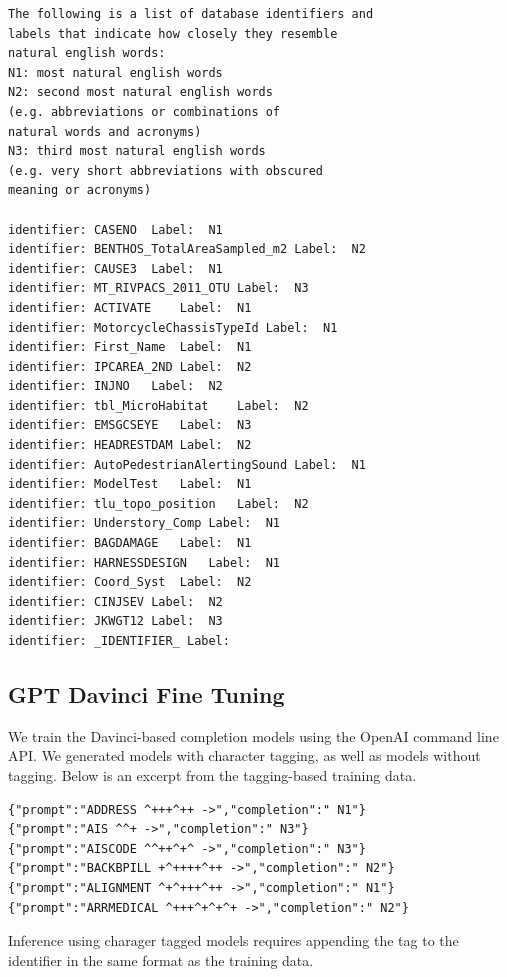 \begin{verbatim}
The following is a list of database identifiers and 
labels that indicate how closely they resemble 
natural english words:
N1: most natural english words
N2: second most natural english words 
(e.g. abbreviations or combinations of 
natural words and acronyms)
N3: third most natural english words 
(e.g. very short abbreviations with obscured 
meaning or acronyms)

identifier:	CASENO	Label:	N1
identifier:	BENTHOS_TotalAreaSampled_m2	Label:	N2
identifier:	CAUSE3	Label:	N1
identifier:	MT_RIVPACS_2011_OTU	Label:	N3
identifier:	ACTIVATE	Label:	N1
identifier:	MotorcycleChassisTypeId	Label:	N1
identifier:	First_Name	Label:	N1
identifier:	IPCAREA_2ND	Label:	N2
identifier:	INJNO	Label:	N2
identifier:	tbl_MicroHabitat	Label:	N2
identifier:	EMSGCSEYE	Label:	N3
identifier:	HEADRESTDAM	Label:	N2
identifier:	AutoPedestrianAlertingSound	Label:	N1
identifier:	ModelTest	Label:	N1
identifier:	tlu_topo_position	Label:	N2
identifier:	Understory_Comp	Label:	N1
identifier:	BAGDAMAGE	Label:	N1
identifier:	HARNESSDESIGN	Label:	N1
identifier:	Coord_Syst	Label:	N2
identifier:	CINJSEV	Label:	N2
identifier:	JKWGT12	Label:	N3
identifier: _IDENTIFIER_ Label:
\end{verbatim}


\subsection{GPT Davinci Fine Tuning}

We train the Davinci-based completion models using the OpenAI command line API.
We generated models with character tagging, as well as models without tagging.
Below is an excerpt from the tagging-based training data.

\begin{verbatim}
{"prompt":"ADDRESS ^+++^++ ->","completion":" N1"}
{"prompt":"AIS ^^+ ->","completion":" N3"}
{"prompt":"AISCODE ^^++^+^ ->","completion":" N3"}
{"prompt":"BACKBPILL +^++++^++ ->","completion":" N2"}
{"prompt":"ALIGNMENT ^+^+++^++ ->","completion":" N1"}
{"prompt":"ARRMEDICAL ^+++^+^+^+ ->","completion":" N2"}
\end{verbatim}

Inference using charager tagged models requires appending the tag to the identifier in the same format as the training data.

